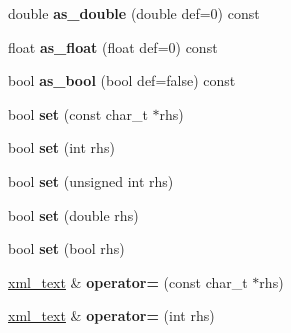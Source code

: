 \begin{DoxyCompactItemize}
\item 
\hypertarget{classpugi_1_1xml__text_aa6722fcf1c4e10ee11b6df73bef11cee}{}double {\bfseries as\+\_\+double} (double def=0) const \label{classpugi_1_1xml__text_aa6722fcf1c4e10ee11b6df73bef11cee}

\item 
\hypertarget{classpugi_1_1xml__text_a158482df06cd778542d7cedb1c33e39f}{}float {\bfseries as\+\_\+float} (float def=0) const \label{classpugi_1_1xml__text_a158482df06cd778542d7cedb1c33e39f}

\item 
\hypertarget{classpugi_1_1xml__text_ab591c10f3adc62024cf8ffc53c4e372e}{}bool {\bfseries as\+\_\+bool} (bool def=false) const \label{classpugi_1_1xml__text_ab591c10f3adc62024cf8ffc53c4e372e}

\item 
\hypertarget{classpugi_1_1xml__text_ab31930ff4f5ad568549f85dbb697e60e}{}bool {\bfseries set} (const char\+\_\+t $\ast$rhs)\label{classpugi_1_1xml__text_ab31930ff4f5ad568549f85dbb697e60e}

\item 
\hypertarget{classpugi_1_1xml__text_a66ebe5bd62e843197305ed68661b0a26}{}bool {\bfseries set} (int rhs)\label{classpugi_1_1xml__text_a66ebe5bd62e843197305ed68661b0a26}

\item 
\hypertarget{classpugi_1_1xml__text_a9d780e113aa0b1f4bbf2d0a88fe2c42f}{}bool {\bfseries set} (unsigned int rhs)\label{classpugi_1_1xml__text_a9d780e113aa0b1f4bbf2d0a88fe2c42f}

\item 
\hypertarget{classpugi_1_1xml__text_acf32e49c31a07f7bad1f9bdfb71bdc1e}{}bool {\bfseries set} (double rhs)\label{classpugi_1_1xml__text_acf32e49c31a07f7bad1f9bdfb71bdc1e}

\item 
\hypertarget{classpugi_1_1xml__text_a0d75ccc7ede3b3d590352267a0f0fcb9}{}bool {\bfseries set} (bool rhs)\label{classpugi_1_1xml__text_a0d75ccc7ede3b3d590352267a0f0fcb9}

\item 
\hypertarget{classpugi_1_1xml__text_a0b895996d14f50afca11b9a82276038d}{}\hyperlink{classpugi_1_1xml__text}{xml\+\_\+text} \& {\bfseries operator=} (const char\+\_\+t $\ast$rhs)\label{classpugi_1_1xml__text_a0b895996d14f50afca11b9a82276038d}

\item 
\hypertarget{classpugi_1_1xml__text_a594653404f095b07d4644a0567f9ec51}{}\hyperlink{classpugi_1_1xml__text}{xml\+\_\+text} \& {\bfseries operator=} (int rhs)\label{classpugi_1_1xml__text_a594653404f095b07d4644a0567f9ec51}


\end{DoxyCompactItemize}
